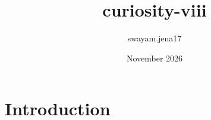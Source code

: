 \documentclass{article}
\title{curiosity-viii}
\author{swayam.jena17 }
\date{November 2026}
\begin{document}
\maketitle

\section{Introduction}
\end{document}

